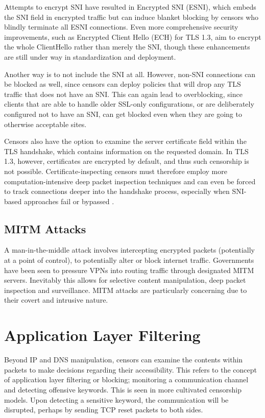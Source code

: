 Attempts to encrypt SNI have resulted in Encrypted SNI (ESNI), which embeds the SNI field in encrypted traffic but can induce blanket blocking by censors who blindly terminate all ESNI connections. Even more comprehensive security improvements, such as Encrypted Client Hello (ECH) for TLS 1.3, aim to encrypt the whole ClientHello rather than merely the SNI, though these enhancements are still under way in standardization and deployment.

Another way is to not include the SNI at all. However, non-SNI connections can be blocked as well, since censors can deploy policies that will drop any TLS traffic that does not have an SNI. This can again lead to overblocking, since clients that are able to handle older SSL-only configurations, or are deliberately configured not to have an SNI, can get blocked even when they are going to otherwise acceptable sites.

Censors also have the option to examine the server certificate field within the TLS handshake, which contains information on the requested domain. In TLS 1.3, however, certificates are encrypted by default, and thus such censorship is not possible. Certificate-inspecting censors must therefore employ more computation-intensive deep packet inspection techniques and can even be forced to track connections deeper into the handshake process, especially when SNI-based approaches fail or bypassed \cite{rfc9505}.

\subsection{MITM Attacks}
A man-in-the-middle attack involves intercepting encrypted packets (potentially at a point of control), to potentially alter or block internet traffic. Governments have been seen to pressure VPNs into routing traffic through designated MITM servers. Inevitably this allows for selective content manipulation, deep packet inspection and surveillance. MITM attacks are particularly concerning due to their covert and intrusive nature.

\section{Application Layer Filtering}
Beyond IP and DNS manipulation, censors can examine the contents within packets to make decisions regarding their accessibility. This refers to the concept of application layer filtering or blocking; monitoring a communication channel and detecting offensive keywords. This is seen in more cultivated censorship models. Upon detecting a sensitive keyword, the communication will be disrupted, perhaps by sending TCP reset packets to both sides.

